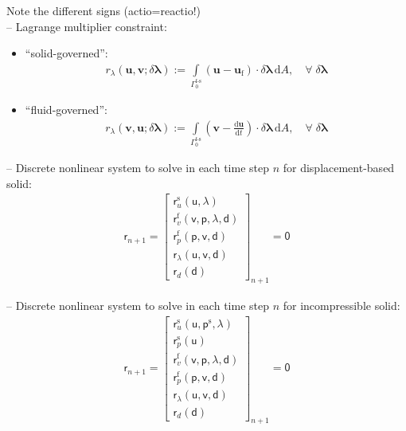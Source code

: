 \documentclass[a4paper,12pt]{report}
\newcommand{\fS}{\text{s}}
\newcommand{\fF}{\text{f}}
\newcommand{\bs}[1]{\boldsymbol{#1}}
\newcommand{\Gm}{\mathit{\Gamma}}
\newcommand{\ROP}{\bs{\mathsf{r}}}
\newcommand{\LM}{\bs{\mathsf{\lambda}}}
\begin{document}
Note the different signs (actio=reactio!)\\

-- Lagrange multiplier constraint:

\begin{itemize}

\item ``solid-governed'':
\begin{align}
r_{\lambda}(\bs{u},\bs{v};\delta\bs{\lambda}):= \int\limits_{\Gm_0^{\mathrm{\fF\text{-}\fS}}} \left(\bs{u} - \bs{u}_{\mathrm{f}}\right)\cdot\delta\bs{\lambda}\,\mathrm{d}A, \quad \forall \; \delta\bs{\lambda}
\end{align}

\item ``fluid-governed'':
\begin{align}
r_{\lambda}(\bs{v},\bs{u};\delta\bs{\lambda}):= \int\limits_{\Gm_0^{\mathrm{\fF\text{-}\fS}}} \left(\bs{v} - \frac{\mathrm{d} \bs{u}}{\mathrm{d} t}\right)\cdot\delta\bs{\lambda}\,\mathrm{d}A, \quad \forall \; \delta\bs{\lambda}
\end{align}

\end{itemize}


-- Discrete nonlinear system to solve in each time step $n$ for displacement-based solid:
\begin{align}
\ROP_{n+1} = \begin{bmatrix} \ROP_{u}^{\mathrm{s}}(\bs{\mathsf{u}},\LM) \\ \ROP_{v}^{\mathrm{f}}(\bs{\mathsf{v}},\bs{\mathsf{p}},\LM,\bs{\mathsf{d}}) \\ \ROP_{p}^{\mathrm{f}}(\bs{\mathsf{p}},\bs{\mathsf{v}},\bs{\mathsf{d}}) \\ \ROP_{\mathit{\lambda}}(\bs{\mathsf{u}},\bs{\mathsf{v}},\bs{\mathsf{d}}) \\ \ROP_{d}(\bs{\mathsf{d}}) \end{bmatrix}_{n+1} = \bs{\mathsf{0}}\label{eq:nonlin_sys_fsi}
\end{align}

-- Discrete nonlinear system to solve in each time step $n$ for incompressible solid:
\begin{align}
\ROP_{n+1} = \begin{bmatrix} \ROP_{u}^{\mathrm{s}}(\bs{\mathsf{u}},\bs{\mathsf{p}}^{\mathrm{s}},\LM) \\ \ROP_{p}^{\mathrm{s}}(\bs{\mathsf{u}}) \\ \ROP_{v}^{\mathrm{f}}(\bs{\mathsf{v}},\bs{\mathsf{p}},\LM,\bs{\mathsf{d}}) \\ \ROP_{p}^{\mathrm{f}}(\bs{\mathsf{p}},\bs{\mathsf{v}},\bs{\mathsf{d}}) \\ \ROP_{\mathit{\lambda}}(\bs{\mathsf{u}},\bs{\mathsf{v}},\bs{\mathsf{d}}) \\ \ROP_{d}(\bs{\mathsf{d}}) \end{bmatrix}_{n+1} = \bs{\mathsf{0}}\label{eq:nonlin_sys_fsi_inc}
\end{align}
\end{document}
